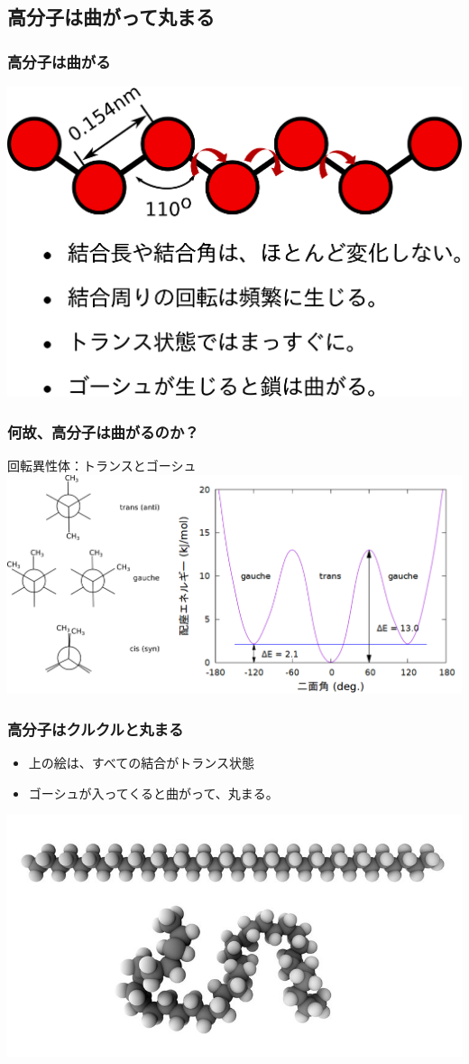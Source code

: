 \documentclass[12pt, dvipdfmx]{beamer}
\begin{document}
\subsection{高分子は曲がって丸まる}
\begin{frame}
	\frametitle{高分子は曲がる}
	\centering
	\includegraphics[width=.8\textwidth]{polymer_model_2.png}
\end{frame}

\begin{frame}
	\frametitle{何故、高分子は曲がるのか？}
	回転異性体：トランスとゴーシュ
	\vspace{5mm}
	\centering
	\includegraphics[width=\textwidth]{butane.png}
\end{frame}

\begin{frame}
	\frametitle{高分子はクルクルと丸まる}
	\begin{itemize}
		\item 上の絵は、すべての結合がトランス状態
		\item ゴーシュが入ってくると曲がって、丸まる。
	\end{itemize}
	\centering
	\includegraphics[width=\textwidth]{PE.jpg}
\end{frame}
\end{document}
